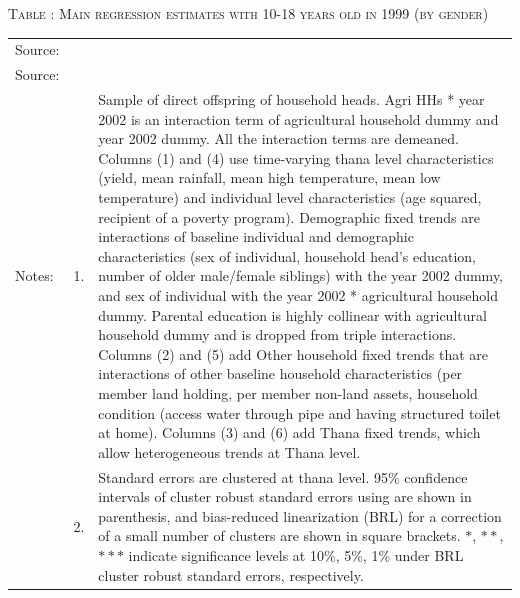 \documentclass[12pt,letterpaper]{article}
\newcommand{\0}{\ensuremath{\mbox{\boldmath $0$}}}
\begin{document}
\begin{table}
\hfil\textsc{\footnotesize Table \thetable: Main regression estimates with 10-18 years old in 1999 (by gender)\label{MainGender10}}\\
\setlength{\tabcolsep}{1pt}
\renewcommand{\arraystretch}{.75}
\hfil
\renewcommand{\arraystretch}{1}
\hfil\begin{tabular}{>{\hfill\scriptsize}p{1cm}<{}>{\hfill\scriptsize}p{.5cm}<{}>{\scriptsize}p{12cm}<{\hfill}}
Source:& \multicolumn{2}{l}{\scriptsize Compiled from IFPRI data. }\\[-1ex]
Source:& \multicolumn{2}{l}{\scriptsize Compiled from IFPRI data. }\\[-1ex]
Notes:& 1. & Sample of direct offspring of household heads. \textsf{Agri HHs * year 2002} is an interaction term of agricultural household dummy and year 2002 dummy. All the interaction terms are demeaned. Columns \textsf{(1) and (4)} use time-varying thana level characteristics (yield, mean rainfall, mean high temperature, mean low temperature) and individual level characteristics (age squared, recipient of a poverty program). \textsf{Demographic fixed trends} are interactions of baseline individual and demographic characteristics (sex of individual, household head's education, number of older male/female siblings) with the year 2002 dummy, and sex of individual with the year 2002 * agricultural household dummy. Parental education is highly collinear with agricultural household dummy and is dropped from triple interactions. Columns \textsf{(2) and (5)} add \textsf{Other household fixed trends} that are interactions of other baseline household characteristics (per member land holding, per member non-land assets, household condition (access water through pipe and having structured toilet at home). Columns \textsf{(3) and (6)} add \textsf{Thana fixed trends}, which allow heterogeneous trends at Thana level. \\[-1ex]
& 2. & Standard errors are clustered at thana level. 95\% confidence intervals of cluster robust standard errors using \cite{liang1986longitudinal} are shown in parenthesis, and bias-reduced linearization (BRL) for a correction of a small number of clusters are shown in square brackets. $*$, $**$, $***$ indicate significance levels at 10\%, 5\%, 1\% under BRL cluster robust standard errors, respectively.
\end{tabular}
\end{table}
\end{document}

